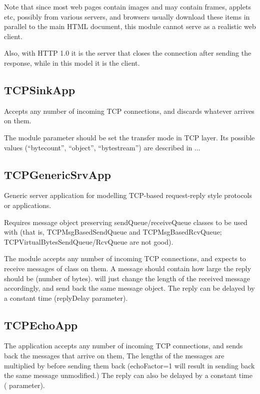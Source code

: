 Note that since most web pages contain images and may contain frames,
applets etc, possibly from various servers, and browsers usually download
these items in parallel to the main HTML document, this module cannot
serve as a realistic web client.

Also, with HTTP 1.0 it is the server that closes the connection after
sending the response, while in this model it is the client.

\subsection{TCPSinkApp}

Accepts any number of incoming TCP connections, and discards whatever
arrives on them.

The module parameter  should be set the transfer mode in TCP layer.
Its possible values (``bytecount'', ``object'', ``bytestream'') are described in ...

\subsection{TCPGenericSrvApp}

Generic server application for modelling TCP-based request-reply style
protocols or applications.

Requires message object preserving sendQueue/receiveQueue classes
to be used with  (that is, TCPMsgBasedSendQueue and TCPMsgBasedRcvQueue;
TCPVirtualBytesSendQueue/RcvQueue are not good).

The module accepts any number of incoming TCP connections, and expects
to receive messages of class  on them. A message should
contain how large the reply should be (number of bytes). 
will just change the length of the received message accordingly, and send
back the same message object. The reply can be delayed by a constant time
(replyDelay parameter).

\subsection{TCPEchoApp}

The  application accepts any number of incoming TCP
connections, and sends back the messages that arrive on them, The lengths of the
messages are multiplied by  before sending them back (echoFactor=1
will result in sending back the same message unmodified.) The reply can also be
delayed by a constant time ( parameter).

